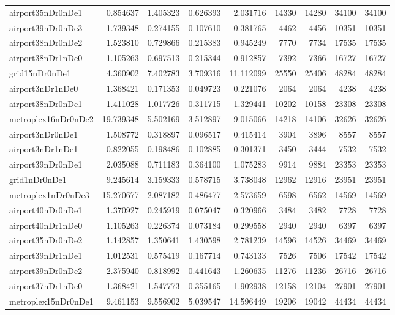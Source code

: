 \begin{longtable}{|l|r|r|r|r|r|r|r|r|}
airport35nDr0nDe1 & 0.854637 & 1.405323 & 0.626393 & 2.031716 & 14330 & 14280 & 34100 & 34100 \\
airport39nDr0nDe3 & 1.739348 & 0.274155 & 0.107610 & 0.381765 & 4462 & 4456 & 10351 & 10351 \\
airport38nDr0nDe2 & 1.523810 & 0.729866 & 0.215383 & 0.945249 & 7770 & 7734 & 17535 & 17535 \\
airport38nDr1nDe0 & 1.105263 & 0.697513 & 0.215344 & 0.912857 & 7392 & 7366 & 16727 & 16727 \\
grid15nDr0nDe1 & 4.360902 & 7.402783 & 3.709316 & 11.112099 & 25550 & 25406 & 48284 & 48284 \\
airport3nDr1nDe0 & 1.368421 & 0.171353 & 0.049723 & 0.221076 & 2064 & 2064 & 4238 & 4238 \\
airport38nDr0nDe1 & 1.411028 & 1.017726 & 0.311715 & 1.329441 & 10202 & 10158 & 23308 & 23308 \\
metroplex16nDr0nDe2 & 19.739348 & 5.502169 & 3.512897 & 9.015066 & 14218 & 14106 & 32626 & 32626 \\
airport3nDr0nDe1 & 1.508772 & 0.318897 & 0.096517 & 0.415414 & 3904 & 3896 & 8557 & 8557 \\
airport3nDr1nDe1 & 0.822055 & 0.198486 & 0.102885 & 0.301371 & 3450 & 3444 & 7532 & 7532 \\
airport39nDr0nDe1 & 2.035088 & 0.711183 & 0.364100 & 1.075283 & 9914 & 9884 & 23353 & 23353 \\
grid1nDr0nDe1 & 9.245614 & 3.159333 & 0.578715 & 3.738048 & 12962 & 12916 & 23951 & 23951 \\
metroplex1nDr0nDe3 & 15.270677 & 2.087182 & 0.486477 & 2.573659 & 6598 & 6562 & 14569 & 14569 \\
airport40nDr0nDe1 & 1.370927 & 0.245919 & 0.075047 & 0.320966 & 3484 & 3482 & 7728 & 7728 \\
airport40nDr1nDe0 & 1.105263 & 0.226374 & 0.073184 & 0.299558 & 2940 & 2940 & 6397 & 6397 \\
airport35nDr0nDe2 & 1.142857 & 1.350641 & 1.430598 & 2.781239 & 14596 & 14526 & 34469 & 34469 \\
airport39nDr1nDe1 & 1.012531 & 0.575419 & 0.167714 & 0.743133 & 7526 & 7506 & 17542 & 17542 \\
airport39nDr0nDe2 & 2.375940 & 0.818992 & 0.441643 & 1.260635 & 11276 & 11236 & 26716 & 26716 \\
airport37nDr1nDe0 & 1.368421 & 1.547773 & 0.355165 & 1.902938 & 12158 & 12104 & 27901 & 27901 \\
metroplex15nDr0nDe1 & 9.461153 & 9.556902 & 5.039547 & 14.596449 & 19206 & 19042 & 44434 & 44434 \\

\end{longtable}
